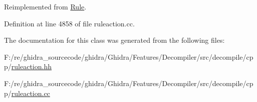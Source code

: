 Reimplemented from \mbox{\hyperlink{class_rule_a4023bfc7825de0ab866790551856d10e}{Rule}}.



Definition at line 4858 of file ruleaction.\+cc.



The documentation for this class was generated from the following files\+:\begin{DoxyCompactItemize}
\item 
F\+:/re/ghidra\+\_\+sourcecode/ghidra/\+Ghidra/\+Features/\+Decompiler/src/decompile/cpp/\mbox{\hyperlink{ruleaction_8hh}{ruleaction.\+hh}}\item 
F\+:/re/ghidra\+\_\+sourcecode/ghidra/\+Ghidra/\+Features/\+Decompiler/src/decompile/cpp/\mbox{\hyperlink{ruleaction_8cc}{ruleaction.\+cc}}\end{DoxyCompactItemize}
